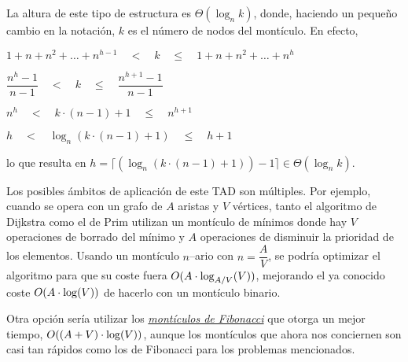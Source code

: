 La altura de este tipo de estructura  es $\Theta(\log_nk)$, donde, haciendo un pequeño cambio en la notación, $k$ es el número de nodos del montículo. En efecto, 

\begin{center}
	{\centering
		$1 + n + n^2 + \ldots + n^{h-1} \quad<\quad k \quad\leq\quad 1 + n + n^2 + \ldots + n^h$\par
		$\dfrac{n^h -1}{n - 1} \quad<\quad k \quad\leq\quad \dfrac{n^{h+1} -1}{n - 1}$\par
		$n^h \quad<\quad k\cdot(n - 1) + 1 \quad\leq\quad n^{h+1}$\par
		$h \quad<\quad \log_n(k\cdot(n - 1) + 1) \quad\leq\quad h+1$\par
	}
\end{center}
lo que resulta en $h = \lceil(\log_n(k\cdot(n - 1) + 1)) - 1\rceil \in \Theta(\log_nk)$.
\newline

Los posibles ámbitos de aplicación de este TAD son múltiples. Por ejemplo, cuando se opera con un grafo de $A$ aristas y $V$ vértices, tanto el algoritmo de Dijkstra como el de Prim utilizan un montículo de mínimos donde hay $V$ operaciones de borrado del mínimo y $A$ operaciones de disminuir la prioridad de los elementos. Usando un montículo $n$--ario con $n = \dfrac{A}{V}$, se podría optimizar el algoritmo para que su coste fuera $O(A\cdot\log_{A/V}(V))$, mejorando el ya conocido coste $O(A\cdot\log(V))$ de hacerlo con un montículo binario.
\newline

Otra opción sería utilizar los \href{https://es.wikipedia.org/wiki/Mont\%C3\%ADculo_de_Fibonacci}{\textcolor{hyperlinkColour}{\textit{montículos de Fibonacci}}} que otorga un mejor tiempo, $O((A + V)\cdot\log(V))$, aunque los montículos que ahora nos conciernen son casi tan rápidos como los de Fibonacci para los problemas mencionados.